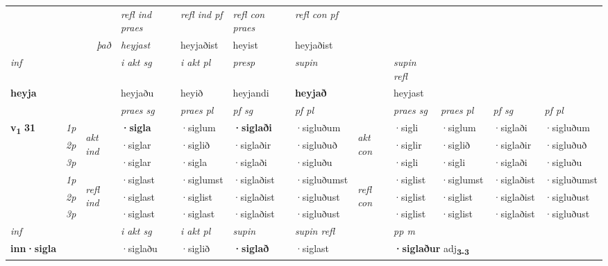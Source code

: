 \begin{longtable}[l]{X>{\footnotesize\itshape}llXXXXlXXXX}
 & && \textit{refl ind praes} & \textit{refl ind pf} & \textit{refl con praes} & \textit{refl con pf} \\*
\multicolumn{3}{r}{\textit{það}}& heyjast & heyjaðist & heyist & heyjaðist \\*

\cmidrule{4-7}
   {\textit{inf}} & &  & \textit{i akt sg} & \textit{i akt pl}   & \textit{presp} & \textit{supin} && \textit{supin refl}  \\*
  {\textbf{heyja}} & && heyjaðu  & heyið   & heyjandi &  \textbf{heyjað} && heyjast  \\*

\midrule

 & &   & \textit{praes sg}  & \textit{praes pl}    & \textit{ pf sg} & \textit{pf pl} & & \textit{praes sg}  & \textit{praes pl}    & \textit{pf sg} & \textit{pf pl }  \\ \cmidrule{4-7} \cmidrule{9-12}
 \multirow{2}{*}{{{\textbf{v{\textsubscript{1}}} \Large{\textbf{31}}}}}  & 1p & \multirow{3}{*}{\begin{turn}{90}\textit{akt ind}\end{turn}} & \textbf{·sigla} & ·siglum & \textbf{·siglaði} & ·sigluðum & \multirow{3}{*}{\begin{turn}{90}\textit{akt con}\end{turn}} &·sigli & ·siglum & ·siglaði & ·sigluðum\\*
 & 2p &  &  ·siglar  & ·siglið & ·siglaðir & ·sigluðuð & & ·siglir & ·siglið & ·siglaðir & ·sigluðuð \\*
 & 3p &  & ·siglar & ·sigla & ·siglaði & ·sigluðu & & ·sigli & ·sigli& ·siglaði & ·sigluðu \\*
\cmidrule{4-7} \cmidrule{9-12}
 & 1p & \multirow{3}{*}{\begin{turn}{90}\textit{refl ind}\end{turn}}  & ·siglast & ·siglumst & ·siglaðist & ·sigluðumst & \multirow{3}{*}{\begin{turn}{90}\textit{refl con}\end{turn}}  &·siglist & ·siglumst & ·siglaðist & ·sigluðumst \\*
 & 2p &  & ·siglast & ·siglist & ·siglaðist & ·sigluðust & &·siglist & ·siglist & ·siglaðist & ·sigluðust \\*
 & 3p  & & ·siglast & ·siglast & ·siglaðist & ·sigluðust & & ·siglist & ·siglist& ·siglaðist & ·sigluðust \\*
\cmidrule{4-7} \cmidrule{9-12}

   {\textit{inf}} & &  & \textit{i akt sg} & \textit{i akt pl}    & \textit{supin} & \textit{supin refl} && \textit{pp m} \\*
  {\textbf{inn\allowbreak ·sigla}} & && ·siglaðu  & ·siglið    &  \textbf{·siglað} & ·siglast && \multicolumn{2}{l}{\textbf{·siglaður} adj\textbf{\textsubscript{3-3}}} \\*


\end{longtable}
